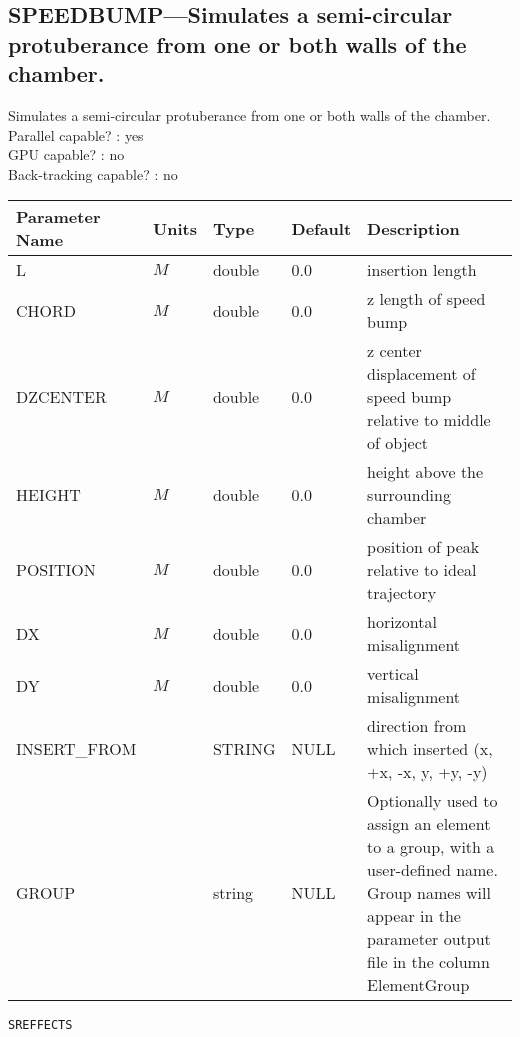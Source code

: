 \subsection{SPEEDBUMP---Simulates a semi-circular protuberance from one or both walls of the chamber.}
Simulates a semi-circular protuberance from one or both walls of the chamber.
\\
Parallel capable? : yes\\
GPU capable? : no\\
Back-tracking capable? : no\\
\begin{tabular}{|l|l|l|l|p{\descwidth}|} \hline
Parameter Name & Units & Type & Default & Description \\ \hline 
L & $M$ & double &  0.0 & insertion length  \\ \hline 
CHORD & $M$ & double &  0.0 & z length of speed bump  \\ \hline 
DZCENTER & $M$ & double &  0.0 & z center displacement of speed bump relative to middle of object  \\ \hline 
HEIGHT & $M$ & double &  0.0 & height above the surrounding chamber  \\ \hline 
POSITION & $M$ & double &  0.0 & position of peak relative to ideal trajectory  \\ \hline 
DX & $M$ & double &  0.0 & horizontal misalignment  \\ \hline 
DY & $M$ & double &  0.0 & vertical misalignment  \\ \hline 
INSERT\_FROM &  & STRING &   NULL            & direction from which inserted (x, +x, -x, y, +y, -y)  \\ \hline 
GROUP &  & string & NULL & Optionally used to assign an element to a group, with a user-defined name.  Group names will appear in the parameter output file in the column ElementGroup  \\ \hline 
\end{tabular}

\vspace*{0.5in}

\newpage
\begin{center}{\Large\verb|SREFFECTS|}\end{center}
